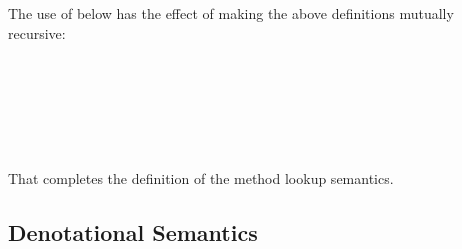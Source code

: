 \begin{AgdaAlign}
The use of  below has the effect of making the above definitions mutually recursive:
%
\begin{code}%
%
\>[4]\AgdaSpace{}%
\AgdaSymbol{:}\AgdaSpace{}%
\AgdaSpace{}%
\AgdaSpace{}%
\AgdaSpace{}%
\AgdaSpace{}%
\AgdaSpace{}%
\AgdaSpace{}%
\<%
\\
%
\>[4]\AgdaSpace{}%
\AgdaSymbol{=}\AgdaSpace{}%
\AgdaSpace{}%
\AgdaSpace{}%
\AgdaSpace{}%
\AgdaSpace{}%
\<%
\\
%
\\[\AgdaEmptyExtraSkip]%
%
\>[4]%
\>[13]\AgdaSymbol{=}\AgdaSpace{}%
\AgdaSpace{}%
\AgdaSymbol{(}\AgdaSpace{}%
\AgdaSymbol{(}\AgdaSpace{}%
\AgdaSymbol{))}\<%
\\
%
\>[4]%
\>[13]\AgdaSymbol{=}\AgdaSpace{}%
\AgdaSpace{}%
\AgdaSymbol{(}\AgdaSpace{}%
\AgdaSymbol{(}\AgdaSpace{}%
\AgdaSymbol{(}\AgdaSpace{}%
\AgdaSymbol{)))}\<%
\\
%
\>[4]%
\>[13]\AgdaSymbol{=}\AgdaSpace{}%
\AgdaSpace{}%
\AgdaSymbol{(}\AgdaSpace{}%
\AgdaSymbol{(}\AgdaSpace{}%
\AgdaSymbol{(}\AgdaSpace{}%
\AgdaSymbol{)))}\<%
\end{code}
%
That completes the definition of the method lookup semantics.

\subsection{Denotational Semantics}


\end{AgdaAlign}
